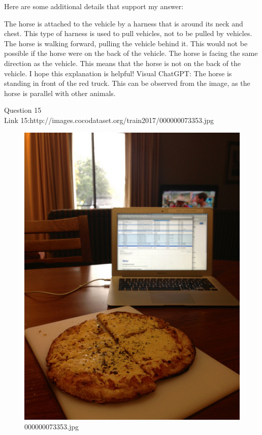 \begin{enumerate}
        Here are some additional details that support my answer:

        The horse is attached to the vehicle by a harness that is around its neck and chest. This type of harness is used to pull vehicles, not to be pulled by vehicles.
        The horse is walking forward, pulling the vehicle behind it. This would not be possible if the horse were on the back of the vehicle.
        The horse is facing the same direction as the vehicle. This means that the horse is not on the back of the vehicle.
        I hope this explanation is helpful!
        \subitem Visual ChatGPT: The horse is standing in front of the red truck. This can be observed from the image, as the horse is parallel with other animals.
    \end{enumerate}
Question 15\\
Link 15:http://images.cocodataset.org/train2017/000000073353.jpg
    \begin{figure}[h]
        \centering
        \includegraphics[width=0.8\linewidth]{../image set/easy/000000073353.jpg}
        \caption{000000073353.jpg}
    \end{figure}
